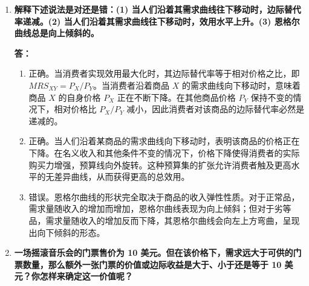 \begin{enumerate}[label=\textbf{\arabic*.}, leftmargin=*]
		将预算约束等式两边对收入 $I$ 求偏导得：
		$$ P_X \frac{\partial X}{\partial I} + P_Y \frac{\partial Y}{\partial I} = 1 $$
		
		若一种商品为劣等品，则其需求量随收入的增加而减少，即需求对收入的偏导数小于零。假设 $X$ 和 $Y$ 均为劣等品，则必然有：
		$$ \frac{\partial X}{\partial I} < 0 \quad \text{且} \quad \frac{\partial Y}{\partial I} < 0 $$
		
		由于商品的价格在现实市场中严格为正（$P_X > 0, P_Y > 0$），上述不等式意味着：
		$$ P_X \frac{\partial X}{\partial I} < 0 \quad \text{且} \quad P_Y \frac{\partial Y}{\partial I} < 0 $$
		
		将两式相加，必然推导出：
		$$ P_X \frac{\partial X}{\partial I} + P_Y \frac{\partial Y}{\partial I} < 0 $$
		
		这一不等式与我们之前求导得出的恒等式产生了逻辑矛盾。因此原假设不成立，在消费者只消费两种商品的情况下，这两种商品不可能同时为劣等品，其中至少有一种必须是正常品，以吸收增加的收入份额。
		
		\item \textbf{解释下述说法是对还是错：(1) 当人们沿着其需求曲线往下移动时，边际替代率递减。(2) 当人们沿着其需求曲线往下移动时，效用水平上升。(3) 恩格尔曲线总是向上倾斜的。}
		
		\textbf{答：}
		\begin{enumerate}[label=(\arabic*), leftmargin=*]
			\item 正确。当消费者实现效用最大化时，其边际替代率等于相对价格之比，即 $MRS_{XY} = P_X/P_Y$。当消费者沿着商品 $X$ 的需求曲线向下移动时，意味着商品 $X$ 的自身价格 $P_X$ 正在不断下降。在其他商品价格 $P_Y$ 保持不变的情况下，相对价格比 $P_X/P_Y$ 减小，因此消费者对该商品的边际替代率必然是递减的。
			\item 正确。当人们沿着某商品的需求曲线向下移动时，表明该商品的价格正在下降。在名义收入和其他条件不变的情况下，价格下降使得消费者的实际购买力增强，预算线向外旋转。这种预算集的扩张允许消费者触及更高水平的无差异曲线，从而获得更高的总效用。
			\item 错误。恩格尔曲线的形状完全取决于商品的收入弹性性质。对于正常品，需求量随收入的增加而增加，恩格尔曲线表现为向上倾斜；但对于劣等品，需求量随收入的增加反而下降，其恩格尔曲线会向左上方弯曲，呈现出向下倾斜的形态。
		\end{enumerate}
		
		\item \textbf{一场摇滚音乐会的门票售价为 10 美元。但在该价格下，需求远大于可供的门票数量，那么额外一张门票的价值或边际收益是大于、小于还是等于 10 美元？你怎样来确定这一价值呢？}
		

\end{enumerate}
